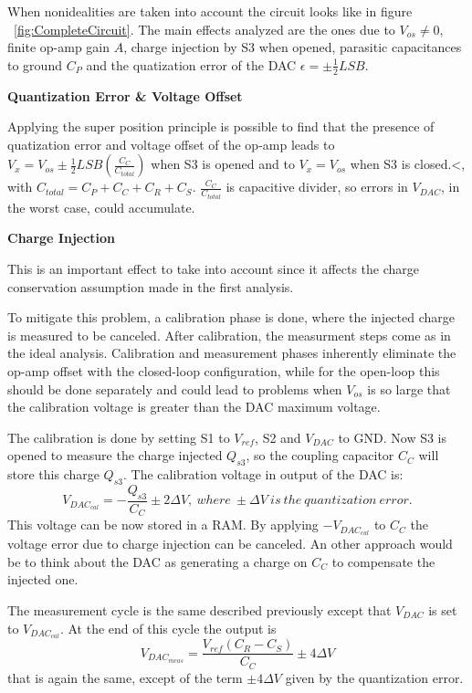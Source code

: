 When nonidealities are taken into account the circuit looks like in figure \Fig~\ref{fig:CompleteCircuit}. The main effects analyzed are the ones due to $V_{os} \neq 0$, finite op-amp gain $A$, charge injection by S3 when opened, parasitic capacitances to ground $C_P$ and the quatization error of the DAC $\epsilon = \pm \frac{1}{2}LSB$.

\textbf{Quantization Error \& Voltage Offset}

Applying the super position principle is possible to find that the presence of quatization error and voltage offset of the op-amp leads to $V_x = V_{os} \pm \frac{1}{2}LSB(\frac{C_C}{C_{total}})$ when S3 is opened and to $V_x = V_{os}$ when S3 is closed.<, with $C_{total} = C_P + C_C + C_R + C_S$. $\frac{C_C}{C_{total}}$ is capacitive divider, so errors in $V_{DAC}$, in the worst case, could accumulate.

\textbf{Charge Injection}

This is an important effect to take into account since it affects the charge conservation assumption made in the first analysis.

To mitigate this problem, a calibration phase is done, where the injected charge is measured to be canceled. After calibration, the measurment steps come as in the ideal analysis.
Calibration and measurement phases inherently eliminate the op-amp offset with the closed-loop configuration, while for the open-loop this should be done separately and could lead to problems when $V_{os}$ is so large that the calibration voltage is greater than the DAC maximum voltage.

The calibration is done by setting S1 to $V_{ref}$, S2 and $V_{DAC}$ to GND. Now S3 is opened to measure the charge injected $Q_{s3}$, so the coupling capacitor $C_C$ will store this charge $Q_{s3}$. The calibration voltage in output of the DAC is:
\[V_{DAC_{cal}} = -\frac{Q_{s3}}{C_C} \pm 2\Delta V, \ where \ \pm\Delta V \ is \ the \ quantization \ error.\]
This voltage can be now stored in a RAM.
By applying $-V_{DAC_{cal}}$ to $C_C$ the voltage error due to charge injection can be canceled. An other approach would be to think about the DAC as generating a charge on $C_C$ to compensate the injected one.

The measurement cycle is the same described previously except that $V_{DAC}$ is set to $V_{DAC_{cal}}$. At the end of this cycle the output is
\[V_{DAC_{meas}} = \frac{V_{ref}(C_R - C_S)}{C_C} \pm 4\Delta V\]
that is again the same, except of the term $\pm 4\Delta V$ given by the quantization error.

